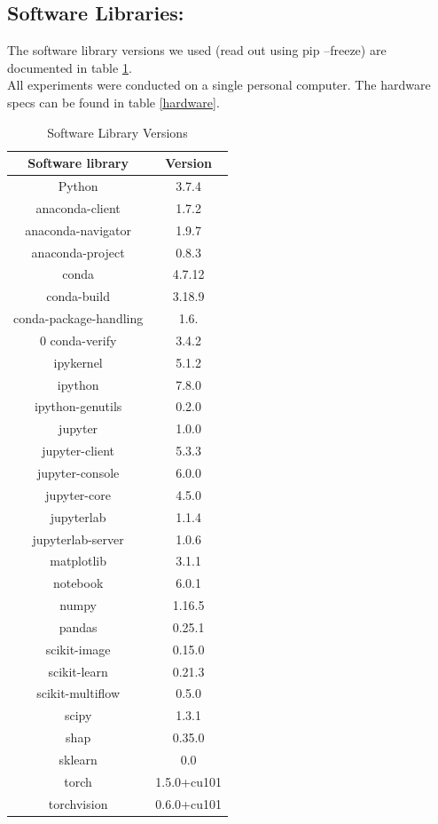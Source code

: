 \documentclass[conference]{IEEEtran}
\begin{document}
\subsection{Software Libraries:}
The software library versions we used (read out using pip --freeze) are documented in table \ref{softwareVersion}.\\
All experiments were conducted on a single personal computer. The hardware specs can be found in table \ref{hardware}.\\


\begin{table}[htbp]
\caption{Software Library Versions}
\begin{center}
\begin{tabular}{|c|c|}
	\hline
	\textbf{Software library} & \textbf{Version} \\
	\hline
	Python & 3.7.4\\ \hline
	anaconda-client & 1.7.2 \\ \hline
	anaconda-navigator & 1.9.7 \\ \hline
	anaconda-project & 0.8.3\\ \hline
	conda & 4.7.12\\ \hline
	conda-build & 3.18.9\\ \hline
	conda-package-handling & 1.6.\\ \hline0
	conda-verify & 3.4.2\\ \hline
	ipykernel & 5.1.2\\ \hline
	ipython & 7.8.0\\ \hline
	ipython-genutils & 0.2.0\\ \hline
	jupyter & 1.0.0\\ \hline
	jupyter-client & 5.3.3\\ \hline
	jupyter-console & 6.0.0\\ \hline
	jupyter-core & 4.5.0\\ \hline
	jupyterlab & 1.1.4\\ \hline
	jupyterlab-server & 1.0.6\\ \hline
	matplotlib & 3.1.1\\ \hline
	notebook & 6.0.1\\ \hline
	numpy & 1.16.5\\ \hline
	pandas & 0.25.1\\ \hline
	scikit-image & 0.15.0\\ \hline
	scikit-learn & 0.21.3\\ \hline
	scikit-multiflow & 0.5.0\\ \hline                 
	scipy & 1.3.1\\ \hline
	shap & 0.35.0\\ \hline
	sklearn & 0.0\\ \hline
	torch & 1.5.0+cu101\\ \hline
	torchvision & 0.6.0+cu101  \\ \hline
	
\end{tabular}
\label{softwareVersion}
\end{center}
\end{table}
\end{document}
